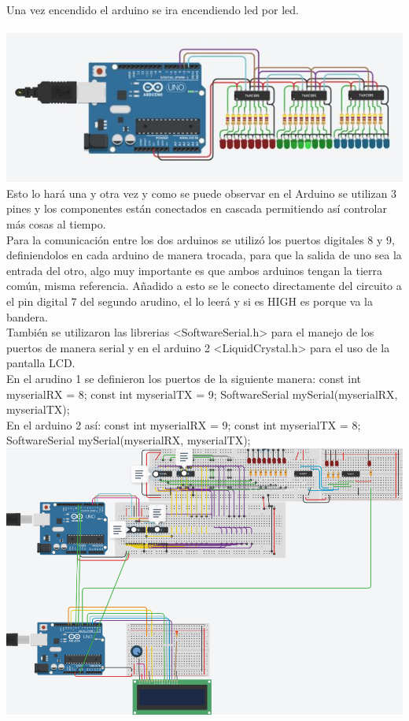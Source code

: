 \documentclass{article}
\begin{document}
Una vez encendido el arduino se ira encendiendo led por led.\\
\\
\includegraphics[scale=0.7]{Captura5.JPG}\\
Esto lo hará una y otra vez y como se puede observar en el Arduino se utilizan 3 pines y los componentes están conectados en cascada permitiendo así controlar más cosas al tiempo.\\

Para la comunicación entre los dos arduinos se utilizó los puertos digitales 8 y 9, definiendolos en cada arduino de manera trocada, para que la salida de uno sea la entrada del otro, algo muy importante es que ambos arduinos tengan la tierra común, misma referencia. Añadido a esto se le conecto directamente del circuito a el pin digital 7 del segundo arudino, el lo leerá y si es HIGH es porque va la bandera.\\

También se utilizaron las librerias <SoftwareSerial.h> para el manejo de los puertos de manera serial y en el arduino 2 <LiquidCrystal.h> para el uso de la pantalla LCD.\\

En el arudino 1 se definieron los puertos de la siguiente manera:
const int myserialRX = 8;
const int myserialTX = 9;
SoftwareSerial mySerial(myserialRX, myserialTX);\\

En el arduino 2 así:
const int myserialRX = 9;
const int myserialTX = 8;
SoftwareSerial mySerial(myserialRX, myserialTX);\\

\includegraphics[scale=0.7]{Captura7.PNG}\\
\end{document}
